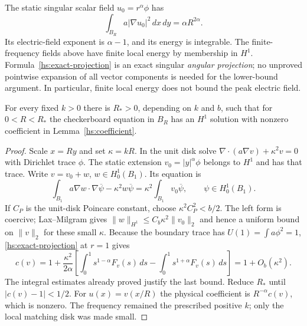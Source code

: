\begin{remark}
\label{hs:integrability}
The static singular scalar field $u_0=r^\alpha\phi$ has
\begin{equation}
 \int_{B_R}a|\nabla u_0|^2\,dx\,dy=\alpha R^{2\alpha}.
 \label{hs:static-energy}
\end{equation}
Its electric-field exponent is $\alpha-1$, and its energy is integrable.
The finite-frequency fields above have finite local energy by membership
in $H^1$.  Formula~\eqref{hs:exact-projection} is an exact singular
\emph{angular projection}; no unproved pointwise expansion of all vector
components is needed for the lower-bound argument.  In particular,
finite local energy does not bound the peak electric field.
\end{remark}

\begin{lemma}
\label{hs:local-excitation}
For every fixed $k>0$ there is $R_*>0$, depending on $k$ and $b$, such
that for $0<R<R_*$ the checkerboard equation in $B_R$ has an $H^1$
solution with nonzero coefficient in Lemma~\ref{hs:coefficient}.
\end{lemma}

\begin{proof}
Scale $x=Ry$ and set $\kappa=kR$.  In the unit disk solve
$\nabla\cdot(a\nabla v)+\kappa^2v=0$ with Dirichlet trace $\phi$.
The static extension $v_0=|y|^\alpha\phi$ belongs to $H^1$ and has
that trace.  Write $v=v_0+w$, $w\in H_0^1(B_1)$.  Its equation is
\begin{equation}
 \int_{B_1}a\nabla w\cdot\nabla\overline\psi
       -\kappa^2w\overline\psi
 =\kappa^2\int_{B_1}v_0\overline\psi,
 \qquad \psi\in H_0^1(B_1).
 \label{hs:dirichlet-perturbation}
\end{equation}
If $C_P$ is the unit-disk Poincare constant, choose
$\kappa^2C_P^2<b/2$.  The left form is coercive; Lax--Milgram gives
$\|w\|_{H^1}\leq C_b\kappa^2\|v_0\|_2$ and hence a uniform bound
on $\|v\|_2$ for these small $\kappa$.
Because the boundary trace has $U(1)=\int a\phi^2=1$,
\eqref{hs:exact-projection} at $r=1$ gives
\begin{equation}
 c(v)=1+\frac{\kappa^2}{2\alpha}
 \left[\int_0^1s^{1-\alpha}F_v(s)\,ds
       -\int_0^1s^{1+\alpha}F_v(s)\,ds\right]
       =1+O_b(\kappa^2).
 \label{hs:nonzero-coefficient}
\end{equation}
The integral estimates already proved justify the last bound.
Reduce $R_*$ until $|c(v)-1|<1/2$.
For $u(x)=v(x/R)$ the physical coefficient is $R^{-\alpha}c(v)$,
which is nonzero.  The frequency remained the prescribed positive $k$;
only the local matching disk was made small.
\end{proof}

